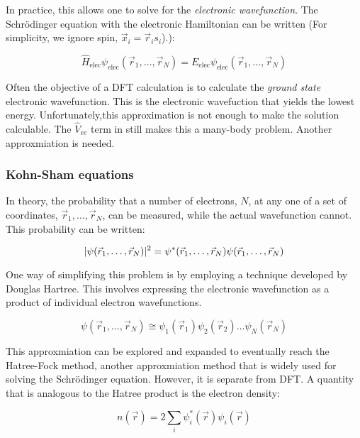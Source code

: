 In practice, this allows one to solve for the \textit{electronic
wavefunction}.
The Schr\"odinger equation with
the electronic Hamiltonian can be written (For simplicity, we ignore
spin, $\vec x_i = \vec r_i s_i$).):

\begin{equation}
\hat H_{\text{elec}}\psi_{\text{elec}}(\vec r_1,\dots,\vec r_N) =
E_{\text{elec}}\psi_{\text{elec}}(\vec r_1, \dots, \vec r_N)
\end{equation}

Often the objective of a DFT calculation is to calculate the
\textit{ground state} electronic
wavefunction. This is the electronic wavefuction that yields the lowest
energy. Unfortunately,this approximation is not enough to make the
solution calculable. The $\hat V_{ee}$ term in 
still makes this a many-body problem. Another approxmiation is needed.

\subsubsection{Kohn-Sham equations}
\label{sec:kohn-sham}
In theory, the probability that a number of electrons, $N$, at any
one of a set of coordinates,
$\vec r_1,\dots,\vec r_N$, can be measured, while the actual
wavefunction cannot. This probability can be written:

\begin{equation}
|\psi(\vec r_1, \dots, \vec r_N)|^2 = \psi^*(\vec r_1, \dots, \vec
r_N)\psi(\vec r_1,\dots, \vec r_N) \\
\end{equation}

One way of simplifying this problem is by employing a technique developed
by Douglas Hartree\cite{hartree}. This involves expressing the electronic
wavefunction as a product of individual electron wavefunctions.

\begin{equation}
\psi(\vec r_1, \dots, \vec r_N) \cong  \psi_1(\vec r_1)\psi_2(\vec
r_2)\dots\psi_N(\vec r_N)
\end{equation}

This approxmiation can be explored and expanded to eventually reach the
Hatree-Fock method, another approxmiation method that is widely used for
solving the Schr\"odinger equation. However, it is separate from DFT. A quantity
that is analogous to the Hatree product is the electron density:

\begin{equation}
n(\vec r) = 2 \sum_i\psi_i^*(\vec r)\psi_i(\vec r)
\label{eq:density}
\end{equation}

